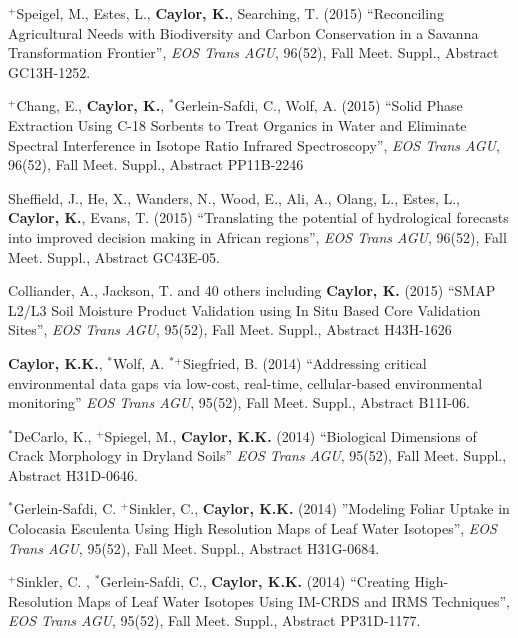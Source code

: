 \documentclass[10pt]{article}
\begin{document}
\begin{etaremune}
\item $^{+}$Speigel, M., Estes, L., \textbf{Caylor, K.}, Searching, T. (2015) ``Reconciling Agricultural Needs with Biodiversity and Carbon Conservation in a Savanna Transformation Frontier'', \emph{EOS Trans AGU}, 96(52), Fall Meet. Suppl., Abstract GC13H-1252.

\item $^{+}$Chang, E., \textbf{Caylor, K.}, $^{*}$Gerlein-Safdi, C., Wolf, A. (2015) ``Solid Phase Extraction Using C-18 Sorbents to Treat Organics in Water and Eliminate Spectral Interference in Isotope Ratio Infrared Spectroscopy'', \emph{EOS Trans AGU}, 96(52), Fall Meet. Suppl., Abstract PP11B-2246

\item Sheffield, J., He, X., Wanders, N., Wood, E., Ali, A., Olang, L., Estes, L., \textbf{Caylor, K.}, Evans, T. (2015) ``Translating the potential of hydrological forecasts into improved decision making in African regions'', \emph{EOS Trans AGU}, 96(52), Fall Meet. Suppl., Abstract GC43E-05.

\item Colliander, A., Jackson, T. and 40 others including \textbf{Caylor, K.} (2015) ``SMAP L2/L3 Soil Moisture Product Validation using In Situ Based Core Validation Sites'', \emph{EOS Trans AGU}, 95(52), Fall Meet. Suppl., Abstract H43H-1626

\item  \textbf{Caylor, K.K.}, $^{*}$Wolf, A.  $^{*}$$^{+}$Siegfried, B. (2014)  ``Addressing critical environmental data gaps via low-cost, real-time, cellular-based environmental monitoring'' \emph{EOS Trans AGU}, 95(52), Fall Meet. Suppl., Abstract B11I-06.

\item $^{*}$DeCarlo, K., $^{+}$Spiegel, M.,  \textbf{Caylor, K.K.} (2014) ``Biological Dimensions of Crack Morphology in Dryland Soils''  \emph{EOS Trans AGU}, 95(52), Fall Meet. Suppl., Abstract H31D-0646.

\item $^{*}$Gerlein-Safdi, C. $^{+}$Sinkler, C., \textbf{Caylor, K.K.} (2014) ''Modeling Foliar Uptake in Colocasia Esculenta Using High Resolution Maps of Leaf Water Isotopes'', \emph{EOS Trans AGU}, 95(52), Fall Meet. Suppl., Abstract H31G-0684.

\item $^{+}$Sinkler, C. , $^{*}$Gerlein-Safdi, C.,  \textbf{Caylor, K.K.} (2014) ``Creating High-Resolution Maps of Leaf Water Isotopes Using IM-CRDS and IRMS Techniques'',  \emph{EOS Trans AGU}, 95(52), Fall Meet. Suppl., Abstract PP31D-1177.


\end{etaremune}
\end{document}
